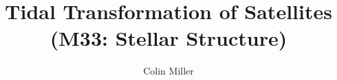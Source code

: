 \documentclass[linenumbers,trackchanges]{aastex7}
\begin{document}
\title{Tidal Transformation of Satellites (M33: Stellar Structure)}
\author{Colin Miller}
\end{document}
